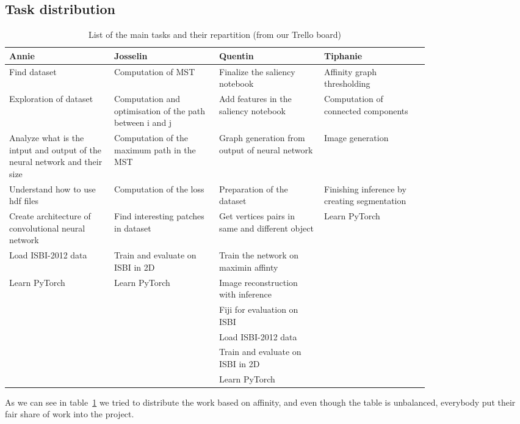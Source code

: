 \subsection{Task distribution}

\begin{table}[!hbtp]
	\centering
	\begin{tabular}{ |p{0.2\linewidth}|p{0.2\linewidth}|p{0.2\linewidth}|p{0.2\linewidth}| } 
		\hline
		Annie & Josselin & Quentin & Tiphanie \\
		\hline
		Find dataset & Computation of MST & Finalize the saliency notebook & Affinity graph thresholding \\ 
		\hline
		Exploration of dataset & Computation and optimisation of the path between i and j & Add features in the saliency notebook & Computation of connected components \\ 
		\hline
		Analyze what is the intput and output of the neural network and their size & Computation of the maximum path in the MST & Graph generation from output of neural network & Image generation \\ 
		\hline
		Understand how to use hdf files & Computation of the loss & Preparation of the dataset & Finishing inference by creating segmentation \\
		\hline
		Create architecture of convolutional neural network & Find interesting patches in dataset & Get vertices pairs in same and different object & Learn PyTorch\\
		\hline
		Load ISBI-2012 data & Train and evaluate on ISBI in 2D & Train the network on maximin affinty & \\
		\hline
		Learn PyTorch & Learn PyTorch & Image reconstruction with inference & \\
		\hline
		  & & Fiji for evaluation on ISBI & \\
		  \hline
		  & & Load ISBI-2012 data & \\
		  \hline
		  & & Train and evaluate on ISBI in 2D & \\
		  \hline
		  & & Learn PyTorch & \\
		  \hline
	\end{tabular}
	\caption{List of the main tasks and their repartition (from our Trello board)}
	\label{tab:tasks}
\end{table}

As we can see in table~\ref{tab:tasks} we tried to distribute the work based on
affinity, and even though the table is unbalanced, everybody put their fair
share of work into the project.\\

